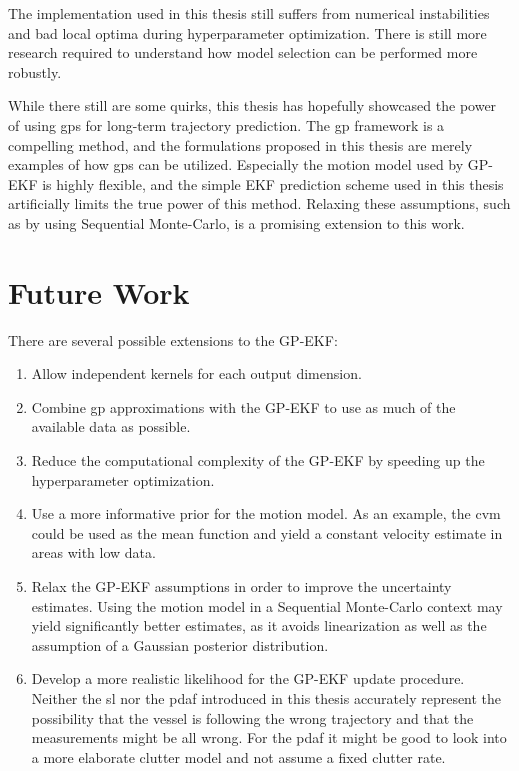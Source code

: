 The implementation used in this thesis still suffers from numerical instabilities and bad local optima during hyperparameter optimization. There is still more research required to understand how model selection can be performed more robustly. 

While there still are some quirks, this thesis has hopefully showcased the power of using \acrshort{gp}s for long-term trajectory prediction. The \acrshort{gp} framework is a compelling method, and the formulations proposed in this thesis are merely examples of how \acrshort{gp}s can be utilized. Especially the motion model used by GP-EKF is highly flexible, and the simple EKF prediction scheme used in this thesis artificially limits the true power of this method. Relaxing these assumptions, such as by using Sequential Monte-Carlo, is a promising extension to this work. 


\section{Future Work}
There are several possible extensions to the GP-EKF:
\begin{enumerate}
    \item Allow independent kernels for each output dimension.
    \item Combine \acrshort{gp} approximations with the GP-EKF to use as much of the available data as possible.
    \item Reduce the computational complexity of the GP-EKF by speeding up the hyperparameter optimization.
    \item Use a more informative prior for the motion model. As an example, the \acrshort{cvm} could be used as the mean function and yield a constant velocity estimate in areas with low data.
    \item Relax the GP-EKF assumptions in order to improve the uncertainty estimates. Using the motion model in a Sequential Monte-Carlo context may yield significantly better estimates, as it avoids linearization as well as the assumption of a Gaussian posterior distribution.
    \item Develop a more realistic likelihood for the GP-EKF update procedure. Neither the \acrshort{sl} nor the \acrshort{pdaf} introduced in this thesis accurately represent the possibility that the vessel is following the wrong trajectory and that the measurements might be all wrong. For the \acrshort{pdaf} it might be good to look into a more elaborate clutter model and not assume a fixed clutter rate.  
\end{enumerate}
